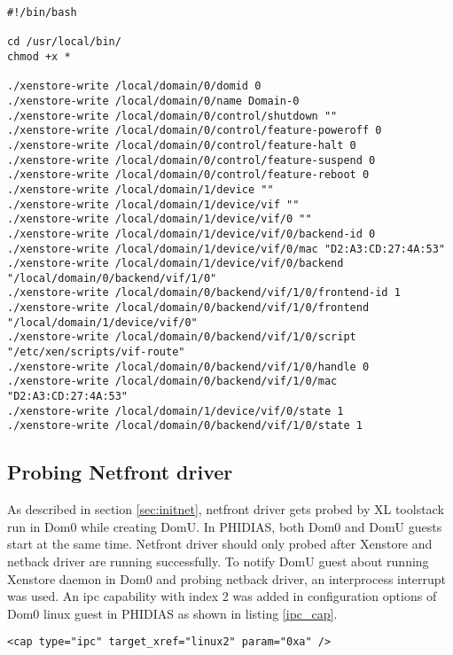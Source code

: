 \begin{lstlisting}[caption= Script used in Dom0 to write necessary keys for network drivers to Xenstore on PHIDIAS ,label={script_startup}]
#!/bin/bash

cd /usr/local/bin/
chmod +x *

./xenstore-write /local/domain/0/domid 0
./xenstore-write /local/domain/0/name Domain-0
./xenstore-write /local/domain/0/control/shutdown ""
./xenstore-write /local/domain/0/control/feature-poweroff 0
./xenstore-write /local/domain/0/control/feature-halt 0
./xenstore-write /local/domain/0/control/feature-suspend 0
./xenstore-write /local/domain/0/control/feature-reboot 0
./xenstore-write /local/domain/1/device ""
./xenstore-write /local/domain/1/device/vif ""
./xenstore-write /local/domain/1/device/vif/0 ""
./xenstore-write /local/domain/1/device/vif/0/backend-id 0
./xenstore-write /local/domain/1/device/vif/0/mac "D2:A3:CD:27:4A:53"
./xenstore-write /local/domain/1/device/vif/0/backend "/local/domain/0/backend/vif/1/0"
./xenstore-write /local/domain/0/backend/vif/1/0/frontend-id 1
./xenstore-write /local/domain/0/backend/vif/1/0/frontend "/local/domain/1/device/vif/0"
./xenstore-write /local/domain/0/backend/vif/1/0/script "/etc/xen/scripts/vif-route"
./xenstore-write /local/domain/0/backend/vif/1/0/handle 0
./xenstore-write /local/domain/0/backend/vif/1/0/mac "D2:A3:CD:27:4A:53"
./xenstore-write /local/domain/1/device/vif/0/state 1
./xenstore-write /local/domain/0/backend/vif/1/0/state 1

\end{lstlisting}

\subsection{Probing Netfront driver \label{sec:probenetfront}}
As described in section \ref{sec:initnet}, netfront driver gets probed by XL toolstack run in Dom0 while creating DomU. In PHIDIAS, both Dom0 and DomU guests start at the same time. Netfront driver should only probed after Xenstore and netback driver are running successfully. To notify DomU guest about running Xenstore daemon in Dom0 and probing netback driver, an interprocess interrupt was used. An ipc capability with index 2 was added in configuration options of Dom0 linux guest in PHIDIAS as shown in listing \ref{ipc_cap}.

\begin{lstlisting}[caption= Capability added in config options of Dom0 linux guest to notify DomU guest to probe netfront driver ,label={ipc_cap}]
    <cap type="ipc" target_xref="linux2" param="0xa" /> 
\end{lstlisting}

